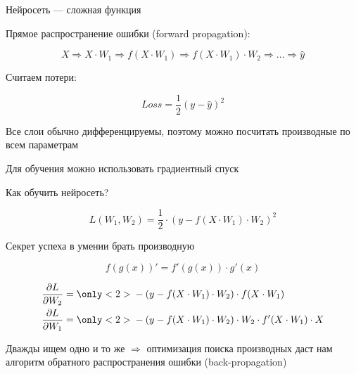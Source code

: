 \documentclass[notes,12pt, aspectratio=169]{beamer}
\newenvironment{wideitemize}{\itemize\addtolength{\itemsep}{10pt}}{\enditemize}
\begin{document}
\begin{frame}{Нейросеть —  сложная функция}
	\begin{wideitemize}
	\item Прямое распространение ошибки (forward propagation): 
	
	\[ X \Rightarrow X \cdot W_1 \Rightarrow f(X \cdot W_1) \Rightarrow f(X \cdot W_1) \cdot W_2 \Rightarrow \ldots \Rightarrow \hat{y} \]
	
	\item Считаем потери:
	
	\[Loss = \frac{1}{2} (y - \hat y)^2\]
	
	\item Все слои обычно дифференцируемы, поэтому можно посчитать производные по всем параметрам
	
	\item Для обучения можно использовать градиентный спуск
	\end{wideitemize}
\end{frame}


\begin{frame}{Как обучить нейросеть?}

\[ L(W_1, W_2) =  \frac{1}{2} \cdot (y - f(X \cdot W_1) \cdot W_2)^2\]

\begin{center}
\alert{Секрет успеха в умении брать производную}
\end{center}

\pause

\[ \boxed{ f(g(x))' = f'(g(x)) \cdot g'(x) }  \]

\pause

\begin{equation*} 
\begin{aligned} 
\frac{\partial L}{\partial W_2} &=   { \only<2>{ \color{red}} - (y - f(X \cdot W_1) \cdot W_2) } \cdot f(X \cdot W_1) \\
\frac{\partial L}{\partial W_1} &= { \only<2>{ \color{red}}  - (y - f(X \cdot W_1) \cdot W_2) } \cdot W_2 \cdot  f'(X \cdot W_1) \cdot X 
\end{aligned}
\end{equation*}

\vfill

\pause

\alert{Дважды ищем одно и то же $\Rightarrow$ оптимизация поиска производных даст нам алгоритм обратного распространения ошибки (back-propagation)}
\end{frame}
\end{document}
